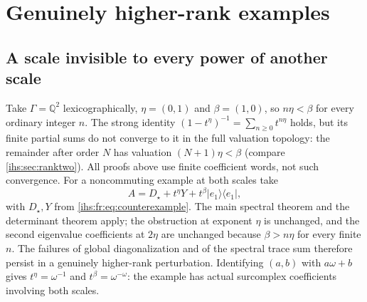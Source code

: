 \documentclass[11pt,a4paper]{article}
\numberwithin{equation}{section}
\theoremstyle{definition}
\theoremstyle{remark}
\newcommand{\Q}{\mathbb Q}
\begin{document}
\section{Genuinely higher-rank examples}\label{ihs:fr:sec:rank}

\subsection{A scale invisible to every power of another scale}\label{ihs:fr:sec:invisible}
Take $\Gamma=\Q^2$ lexicographically, $\eta=(0,1)$ and $\beta=(1,0)$, so
$n\eta<\beta$ for every ordinary integer $n$. The strong identity
$(1-t^\eta)^{-1}=\sum_{n\ge0}t^{n\eta}$ holds, but its finite partial sums
do not converge to it in the full valuation topology: the remainder after
order $N$ has valuation $(N+1)\eta<\beta$ (compare \cref{ihs:sec:ranktwo}).
All proofs above use finite coefficient words, not such convergence. For a
noncommuting example at both scales take
\[
 A=D_\star+t^\eta Y+t^\beta\lvert e_1\rangle\langle e_1\rvert,
\]
with $D_\star,Y$ from \eqref{ihs:fr:eq:counterexample}. The main spectral
theorem and the determinant theorem apply; the obstruction at exponent
$\eta$ is unchanged, and the second eigenvalue coefficients at $2\eta$ are
unchanged because $\beta>n\eta$ for every finite $n$. The failures of global
diagonalization and of the spectral trace sum therefore persist in a
genuinely higher-rank perturbation. Identifying $(a,b)$ with $a\omega+b$
gives $t^\eta=\omega^{-1}$ and $t^\beta=\omega^{-\omega}$: the example has
actual surcomplex coefficients involving both scales.
\end{document}
